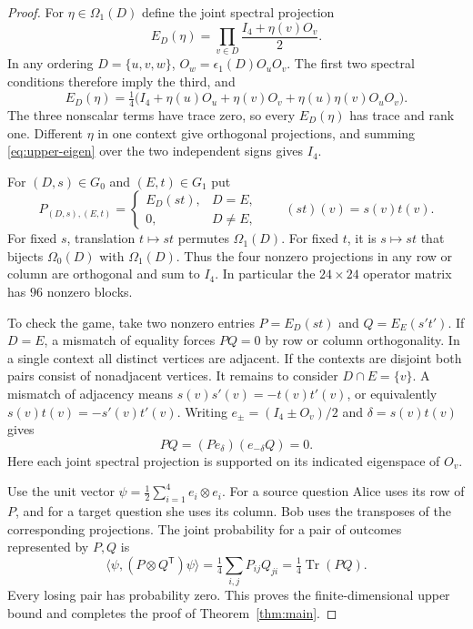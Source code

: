 \documentclass[11pt,reqno]{amsart}
\numberwithin{equation}{section}
\theoremstyle{definition}
\begin{document}
\begin{proof}
For $\eta\in\Omega_1(D)$ define the joint spectral projection
\[
 E_D(\eta)=\prod_{v\in D}\frac{I_4+\eta(v)O_v}{2}.
\]
In any ordering $D=\{u,v,w\}$, $O_w=\epsilon_1(D)O_u O_v$. The first two
spectral conditions therefore imply the third, and
\begin{equation}\label{eq:upper-eigen}
 E_D(\eta)=\tfrac14\big(I_4+\eta(u)O_u+\eta(v)O_v
                              +\eta(u)\eta(v)O_uO_v\big).
\end{equation}
The three nonscalar terms have trace zero, so every $E_D(\eta)$ has trace
and rank one. Different $\eta$ in one context give orthogonal projections,
and summing \eqref{eq:upper-eigen} over the two independent signs gives $I_4$.

For $(D,s)\in G_0$ and $(E,t)\in G_1$ put
\[
 P_{(D,s),(E,t)}=
 \begin{cases} E_D(st),&D=E,\\ 0,&D\ne E,\end{cases}
 \qquad (st)(v)=s(v)t(v).
\]
For fixed $s$, translation $t\mapsto st$ permutes $\Omega_1(D)$. For fixed $t$, it is $s\mapsto st$ that bijects $\Omega_0(D)$ with $\Omega_1(D)$.
Thus the four nonzero projections in any row or column are orthogonal and sum to $I_4$.
In particular the $24\times24$ operator matrix has $96$ nonzero blocks.

To check the game, take two nonzero entries $P=E_D(st)$ and $Q=E_E(s't')$.
If $D=E$, a mismatch of equality forces $PQ=0$ by row or column
orthogonality. In a single context all distinct vertices are adjacent. If
the contexts are disjoint both pairs consist of nonadjacent vertices. It
remains to consider $D\cap E=\{v\}$. A mismatch of adjacency means
$s(v)s'(v)=-t(v)t'(v)$, or equivalently $s(v)t(v)=-s'(v)t'(v)$. Writing
$e_{\pm}=(I_4\pm O_v)/2$ and $\delta=s(v)t(v)$ gives
\[
                 PQ=(P e_{\delta})(e_{-\delta}Q)=0.
\]
Here each joint spectral projection is supported on its indicated eigenspace of $O_v$.

Use the unit vector $\psi=\tfrac12\sum_{i=1}^4e_i\otimes e_i$. For a
source question Alice uses its row of $P$, and for a target question she
uses its column. Bob uses the transposes of the corresponding projections.
The joint probability for a pair of outcomes represented by $P,Q$ is
\[
 \langle\psi,(P\otimes Q^{\mathsf T})\psi\rangle
   =\tfrac14\sum_{i,j}P_{ij}Q_{ji}=\tfrac14\operatorname{Tr}(PQ).
\]
Every losing pair has probability zero. This proves the finite-dimensional
upper bound and completes the proof of Theorem~\ref{thm:main}.
\end{proof}
\end{document}
